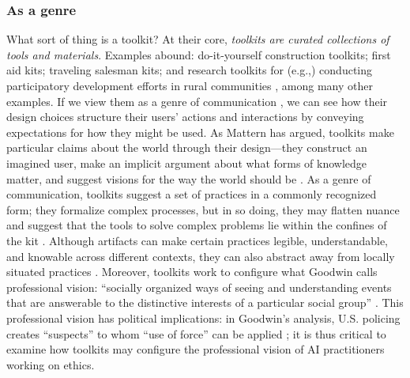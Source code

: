 \documentclass[acmsmall]{acmart}
\begin{document}
\subsubsection{As a genre}
What sort of thing is a toolkit? At their core, \textit{toolkits are curated collections of tools and materials}. Examples abound: do-it-yourself construction toolkits; first aid kits; traveling salesman kits; and research toolkits for (e.g.,) conducting participatory development efforts in rural communities \cite{mattern_2021, kelty_2018}, among many other examples. If we view them as a genre of communication \cite[cf.][]{yates1992genres}, we can see how their design choices structure their users' actions and interactions by conveying expectations for how they might be used. As Mattern has argued, toolkits make particular claims about the world through their design---they construct an imagined user, make an implicit argument about what forms of knowledge matter, and suggest visions for the way the world should be \cite{mattern_2021}. 
As a genre of communication, toolkits suggest a set of practices in a commonly recognized form; they formalize complex processes, but in so doing, they may flatten nuance and suggest that the tools to solve complex problems lie within the confines of the kit \cite{mattern_2021, kelty_2018}. Although artifacts can make certain practices legible, understandable, and knowable across different contexts, they can also abstract away from locally situated practices \cite{Scott1998seeing}. Moreover, toolkits work to configure what Goodwin calls professional vision: ``socially organized ways of seeing and understanding events that are answerable to the distinctive interests of a particular social group'' \cite[p606]{goodwin2015professional}.
This professional vision has political implications: in Goodwin's analysis, U.S. policing creates ``suspects'' to whom ``use of force'' can be applied \cite[p616]{goodwin2015professional}; it is thus critical to examine how toolkits may configure the professional vision of AI practitioners working on ethics.


\end{document}
